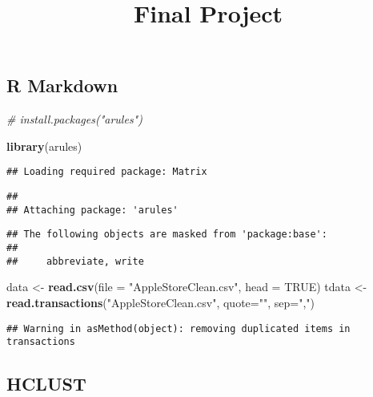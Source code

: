 \documentclass[]{article}
\title{Final Project}
\author{}
\date{}
\newenvironment{Shaded}{\begin{snugshade}}{\end{snugshade}}
\newcommand{\KeywordTok}[1]{\textcolor[rgb]{0.13,0.29,0.53}{\textbf{#1}}}
\newcommand{\DataTypeTok}[1]{\textcolor[rgb]{0.13,0.29,0.53}{#1}}
\newcommand{\StringTok}[1]{\textcolor[rgb]{0.31,0.60,0.02}{#1}}
\newcommand{\CommentTok}[1]{\textcolor[rgb]{0.56,0.35,0.01}{\textit{#1}}}
\newcommand{\OtherTok}[1]{\textcolor[rgb]{0.56,0.35,0.01}{#1}}
\newcommand{\NormalTok}[1]{#1}
\begin{document}
\maketitle

\subsection{R Markdown}\label{r-markdown}

\begin{Shaded}
\begin{Highlighting}[]
\CommentTok{# install.packages("arules")}

\KeywordTok{library}\NormalTok{(arules)}
\end{Highlighting}
\end{Shaded}

\begin{verbatim}
## Loading required package: Matrix
\end{verbatim}

\begin{verbatim}
## 
## Attaching package: 'arules'
\end{verbatim}

\begin{verbatim}
## The following objects are masked from 'package:base':
## 
##     abbreviate, write
\end{verbatim}

\begin{Shaded}
\begin{Highlighting}[]
\NormalTok{data <-}\StringTok{ }\KeywordTok{read.csv}\NormalTok{(}\DataTypeTok{file =} \StringTok{"AppleStoreClean.csv"}\NormalTok{, }\DataTypeTok{head =} \OtherTok{TRUE}\NormalTok{)}
\NormalTok{tdata <-}\StringTok{ }\KeywordTok{read.transactions}\NormalTok{(}\StringTok{"AppleStoreClean.csv"}\NormalTok{, }\DataTypeTok{quote=}\StringTok{""}\NormalTok{, }\DataTypeTok{sep=}\StringTok{","}\NormalTok{)}
\end{Highlighting}
\end{Shaded}

\begin{verbatim}
## Warning in asMethod(object): removing duplicated items in transactions
\end{verbatim}

\subsection{HCLUST}\label{hclust}
\end{document}
